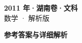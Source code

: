 \documentclass[zihao=-4, a4paper]{ctexart}
\begin{document}
\begin{center}
  {\Large\bfseries 2011 年·湖南卷·文科}\\[4pt]
  {\large 数学 · 解析版}
\end{center}
\medskip
{}

\clearpage
{}
\begin{center}{\Large\bfseries 参考答案与详细解析}\end{center}
\medskip

\end{document}
